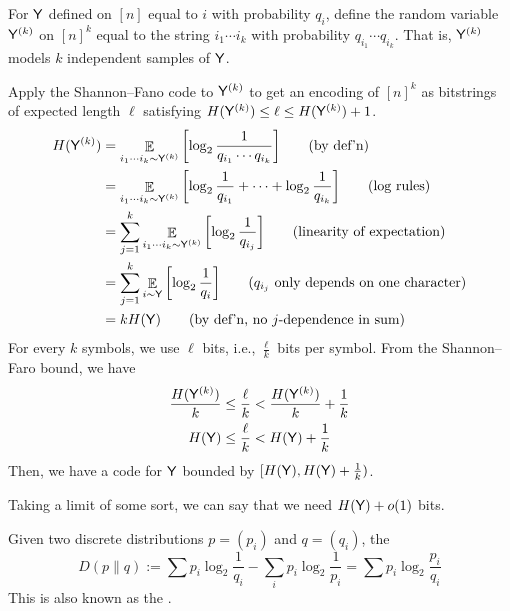 \documentclass[class=co432,notes,tikz]{agony}
\DeclareMathOperator*{\E}{\mathbb{E}}
\begin{document}
\begin{sol}[batching]
  For $\mathsf Y$ defined on $[n]$ equal to $i$ with probability $q_i$,
  define the random variable $\mathsf Y^{(k)}$ on $[n]^k$
  equal to the string $i_1\cdots i_k$ with probability $q_{i_1}\cdots q_{i_k}$.
  That is, $\mathsf Y^{(k)}$ models $k$ independent samples of $\mathsf Y$.

  Apply the Shannon--Fano code to $\mathsf Y^{(k)}$
  to get an encoding of $[n]^k$ as bitstrings of expected length $\ell$
  satisfying $H(\mathsf Y^{(k)}) \leq \ell \leq H(\mathsf Y^{(k)}) + 1$.
  \begin{align*}
    H(\rv Y^{(k)}) & = \E_{i_1\cdots i_k \sim \rv Y^{(k)}}\qty[\log_2 \frac{1}{q_{i_1}\cdots q_{i_k}}] \tag{by def'n}                       \\
                   & = \E_{i_1\cdots i_k \sim \rv Y^{(k)}}\qty[\log_2 \frac{1}{q_{i_1}} + \dotsb + \log_2\frac{1}{q_{i_k}}] \tag{log rules} \\
                   & = \sum_{j=1}^k \E_{i_1\cdots i_k \sim \rv Y^{(k)}}\qty[\log_2 \frac{1}{q_{i_j}}] \tag{linearity of expectation}        \\
                   & = \sum_{j=1}^k \E_{i \sim \rv Y}\qty[\log_2 \frac{1}{q_{i}}] \tag{$q_{i_j}$ only depends on one character}             \\
                   & = kH(\rv Y) \tag{by def'n, no $j$-dependence in sum}
  \end{align*}
  For every $k$ symbols, we use $\ell$ bits, i.e., $\frac{\ell}{k}$ bits per symbol.
  From the Shannon--Faro bound, we have
  \begin{align*}
    \frac{H(\mathsf Y^{(k)})}{k} & \leq \frac{\ell}{k} < \frac{H(\mathsf Y^{(k)})}{k} + \frac{1}{k} \\
    H(\mathsf Y)                 & \leq \frac{\ell}{k} < H(\mathsf Y) + \frac{1}{k}
  \end{align*}
  Then, we have a code for $\mathsf Y$ bounded by
  $[H(\mathsf Y), H(\mathsf Y) + \frac{1}{k})$.

  Taking a limit of some sort, we can say that we need $H(\mathsf Y) + o(1)$ bits.
\end{sol}

\begin{defn*}
  Given two discrete distributions $p = (p_i)$ and $q = (q_i)$,
  the 
  \[ D(p \parallel q) :=
    \sum p_i \log_2\frac{1}{q_i} - \sum_i p_i \log_2 \frac{1}{p_i}
    = \sum p_i \log_2 \frac{p_i}{q_i} \]
  This is also known as the .
\end{defn*}
\end{document}
